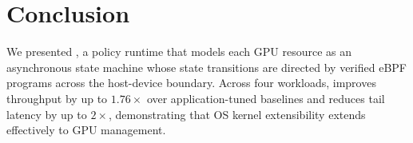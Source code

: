 \section{Conclusion}
\label{sec:conclusion}
We presented \sys, a policy runtime that models each GPU resource as an asynchronous state machine whose state transitions are directed by verified eBPF programs across the host-device boundary.
Across four workloads, \sys improves throughput by up to $1.76\times$ over application-tuned baselines and reduces tail latency by up to $2\times$, demonstrating that OS kernel extensibility extends effectively to GPU management.
